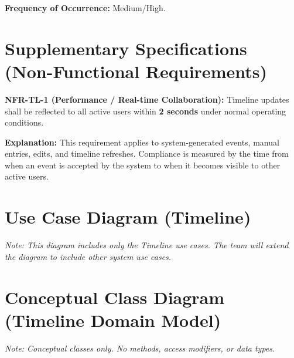 \documentclass[11pt]{article}
\begin{document}
\textbf{Frequency of Occurrence:} Medium/High.

\section{Supplementary Specifications (Non-Functional Requirements)}
\textbf{NFR-TL-1 (Performance / Real-time Collaboration):} Timeline updates shall be reflected to all active users within \textbf{2 seconds} under normal operating conditions.

\textbf{Explanation:} This requirement applies to system-generated events, manual entries, edits, and timeline refreshes. Compliance is measured by the time from when an event is accepted by the system to when it becomes visible to other active users.

\newpage

\section{Use Case Diagram (Timeline)}
\textit{Note: This diagram includes only the Timeline use cases. The team will extend the diagram to include other system use cases.}

\begin{center}
\end{center}

\section{Conceptual Class Diagram (Timeline Domain Model)}
\textit{Note: Conceptual classes only. No methods, access modifiers, or data types.}
\end{document}

